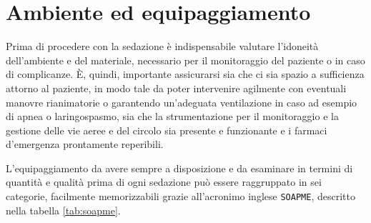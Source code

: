 \newpage

\section{Ambiente ed equipaggiamento}

Prima di procedere con la sedazione è indispensabile valutare l'idoneità dell'ambiente e del materiale, necessario per il monitoraggio del paziente o in caso di complicanze. \`E, quindi, importante assicurarsi sia che ci sia spazio a sufficienza attorno al paziente, in modo tale da poter intervenire agilmente con eventuali manovre rianimatorie o garantendo un'adeguata ventilazione in caso ad esempio di apnea o laringospasmo, sia che la strumentazione per il monitoraggio e la gestione delle vie aeree e del circolo sia presente e funzionante e i farmaci d'emergenza prontamente reperibili. 

L'equipaggiamento da avere sempre a disposizione e da esaminare in termini di quantità e qualità prima di ogni sedazione può essere raggruppato in sei categorie, facilmente memorizzabili grazie all'acronimo inglese \texttt{SOAPME}, descritto nella tabella \ref{tab:soapme}.

